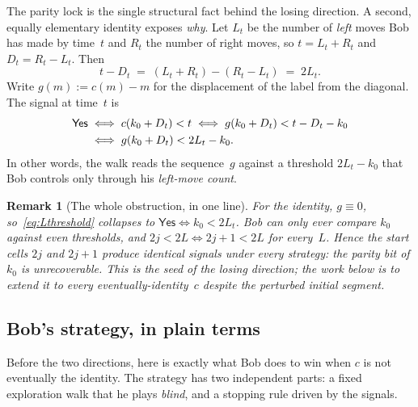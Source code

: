 \documentclass{article}
\newtheorem{remark}[theorem]{Remark}
\newcommand{\Yes}{\textsf{Yes}}
\begin{document}
The parity lock is the single structural fact behind the losing
direction. A second, equally elementary identity exposes \emph{why}.
Let $L_t$ be the number of \emph{left} moves Bob has made by time~$t$ and
$R_t$ the number of right moves, so $t=L_t+R_t$ and $D_t=R_t-L_t$. Then
\begin{equation}\label{eq:tD}
  t - D_t \;=\; (L_t+R_t) - (R_t-L_t) \;=\; 2L_t .
\end{equation}
Write $g(m) := c(m)-m$ for the displacement of the label from the
diagonal. The signal at time~$t$ is
\begin{align}
  \text{\Yes}
  &\iff c(k_0 + D_t) < t
  \iff g(k_0+D_t) < t - D_t - k_0 \notag\\
  &\iff g(k_0+D_t) < 2L_t - k_0 . \label{eq:Lthreshold}
\end{align}
In other words, the walk reads the sequence~$g$ against a threshold
$2L_t - k_0$ that Bob controls only through his \emph{left-move count}.

\begin{remark}[The whole obstruction, in one line]\label{rem:flat}
For the identity, $g\equiv 0$, so~\eqref{eq:Lthreshold} collapses to
$\Yes \iff k_0 < 2L_t$. Bob can only ever compare $k_0$ against
\emph{even} thresholds, and $2j < 2L \iff 2j{+}1 < 2L$ for every~$L$.
Hence the start cells $2j$ and $2j{+}1$ produce \emph{identical signals
under every strategy}: the parity bit of $k_0$ is unrecoverable. This is
the seed of the losing direction; the work below is to extend it to every
eventually-identity~$c$ despite the perturbed initial segment.
\end{remark}

\subsection{Bob's strategy, in plain terms}\label{sec:strategy}

Before the two directions, here is exactly what Bob does to win when $c$ is
not eventually the identity. The strategy has two independent parts: a fixed
exploration walk that he plays \emph{blind}, and a stopping rule driven by
the signals.
\end{document}

